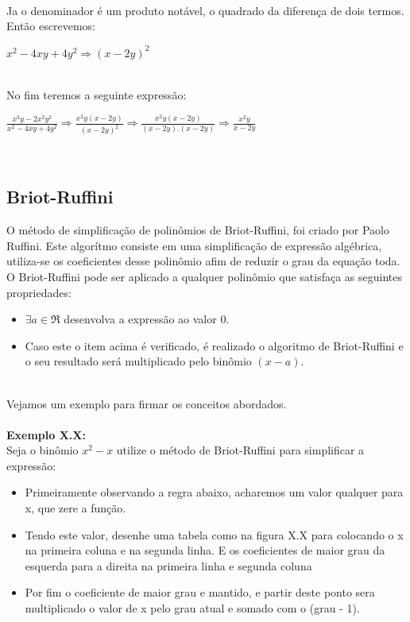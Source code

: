 \documentclass[a4paper,12pt,twoside,BCOR=10mm]{scrbook}
\begin{document}
\begin{titlepage}
\begin{center}
\end{center}
\\
Ja o denominador é um produto notável, o quadrado da diferença de dois termos. Então escrevemos:
\\
\begin{center}
$x^{2} - 4xy + 4y^{2} \Rightarrow (x - 2y)^{2}$
\end{center}
\\
No fim teremos a seguinte expressão:
\\
\begin{center}
$\frac{x^{3}y - 2x^{2}y^{2}}{x^{2} - 4xy + 4y^{2}} \Rightarrow \frac{x^{2}y(x - 2y)}{(x - 2y)^{2}} \Rightarrow \frac{x^{2}y(x - 2y)}{(x - 2y).(x - 2y)} \Rightarrow \frac{x^{2}y}{x - 2y}$
\end{center}
\\
\subsection{Briot-Ruffini}
O método de simplificação de polinômios de Briot-Ruffini, foi criado por Paolo Ruffini. Este algorítmo consiste em uma simplificação de expressão algébrica, utiliza-se os coeficientes desse polinômio afim de reduzir o grau da equação toda. O Briot-Ruffini pode ser aplicado a qualquer polinômio que satisfaça as seguintes propriedades:
\\
\begin{itemize}
\item $\exists a \in \Re $ desenvolva a expressão ao valor 0.
\item Caso este o item acima é verificado, é realizado o algoritmo de Briot-Ruffini e o seu resultado será multiplicado pelo binômio $(x - a)$.  
\end{itemize} 
\\
Vejamos um exemplo para firmar os conceitos abordados.
\\
\\
\textbf{Exemplo X.X:} 
\\
Seja o binômio $x^{2} - x$ utilize o método de Briot-Ruffini para simplificar a expressão: 
\\
\begin{itemize}
\item Primeiramente observando a regra abaixo, acharemos um valor qualquer para x, que zere a função.
\item Tendo este valor, desenhe uma tabela como na figura X.X para colocando o x na primeira coluna e na segunda linha. E os coeficientes de maior grau da esquerda para a direita na primeira linha e segunda coluna
\item Por fim o coeficiente de maior grau e mantido, e partir deste ponto sera multiplicado o valor de x pelo grau atual e somado com o (grau - 1).
\end{itemize}


\end{titlepage}
\end{document}
